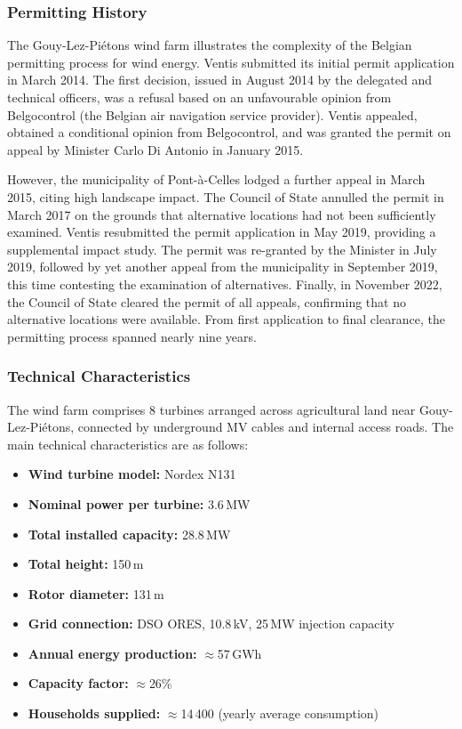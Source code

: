 \subsubsection{Permitting History}

The Gouy-Lez-Pi\'etons wind farm illustrates the complexity of the Belgian permitting process
for wind energy. Ventis submitted its initial permit application in March 2014. The first
decision, issued in August 2014 by the delegated and technical officers, was a refusal based
on an unfavourable opinion from Belgocontrol (the Belgian air navigation service provider).
Ventis appealed, obtained a conditional opinion from Belgocontrol, and was granted the permit
on appeal by Minister Carlo Di Antonio in January 2015.

However, the municipality of Pont-\`a-Celles lodged a further appeal in March 2015, citing
high landscape impact. The Council of State annulled the permit in March 2017 on the grounds
that alternative locations had not been sufficiently examined. Ventis resubmitted the permit
application in May 2019, providing a supplemental impact study. The permit was re-granted by
the Minister in July 2019, followed by yet another appeal from the municipality in September
2019, this time contesting the examination of alternatives. Finally, in November 2022, the
Council of State cleared the permit of all appeals, confirming that no alternative locations
were available. From first application to final clearance, the permitting process spanned
nearly nine years.

\subsubsection{Technical Characteristics}

The wind farm comprises 8 turbines arranged across agricultural land near Gouy-Lez-Pi\'etons,
connected by underground MV cables and internal access roads. The main technical characteristics
are as follows:

\begin{itemize}
  \item \textbf{Wind turbine model:} Nordex N131
  \item \textbf{Nominal power per turbine:} 3.6\,MW
  \item \textbf{Total installed capacity:} 28.8\,MW
  \item \textbf{Total height:} 150\,m
  \item \textbf{Rotor diameter:} 131\,m
  \item \textbf{Grid connection:} DSO ORES, 10.8\,kV, 25\,MW injection capacity
  \item \textbf{Annual energy production:} $\approx$57\,GWh
  \item \textbf{Capacity factor:} $\approx$26\%
  \item \textbf{Households supplied:} $\approx$14\,400 (yearly average consumption)
\end{itemize}

